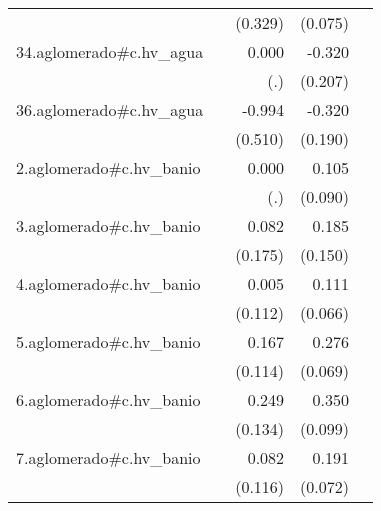 {\begin{longtable}{l*{4}{D{.}{.}{-1}}}
            &                     &     (0.329)         &     (0.075)         &                     \\
\addlinespace
34.aglomerado#c.hv\_agua&                     &       0.000         &      -0.320         &                     \\
            &                     &         (.)         &     (0.207)         &                     \\
\addlinespace
36.aglomerado#c.hv\_agua&                     &      -0.994         &      -0.320         &                     \\
            &                     &     (0.510)         &     (0.190)         &                     \\
\addlinespace
2.aglomerado#c.hv\_banio&                     &       0.000         &       0.105         &                     \\
            &                     &         (.)         &     (0.090)         &                     \\
\addlinespace
3.aglomerado#c.hv\_banio&                     &       0.082         &       0.185         &                     \\
            &                     &     (0.175)         &     (0.150)         &                     \\
\addlinespace
4.aglomerado#c.hv\_banio&                     &       0.005         &       0.111         &                     \\
            &                     &     (0.112)         &     (0.066)         &                     \\
\addlinespace
5.aglomerado#c.hv\_banio&                     &       0.167         &       0.276\sym{***}&                     \\
            &                     &     (0.114)         &     (0.069)         &                     \\
\addlinespace
6.aglomerado#c.hv\_banio&                     &       0.249         &       0.350\sym{***}&                     \\
            &                     &     (0.134)         &     (0.099)         &                     \\
\addlinespace
7.aglomerado#c.hv\_banio&                     &       0.082         &       0.191\sym{**} &                     \\
            &                     &     (0.116)         &     (0.072)         &                     \\

\end{longtable}}
